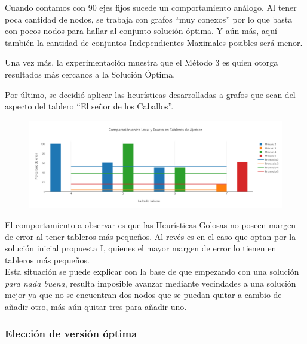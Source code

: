 Cuando contamos con 90 ejes fijos sucede un comportamiento análogo. Al tener poca cantidad de nodos, se trabaja con grafos ``muy conexos'' por lo que basta con pocos nodos para hallar al conjunto solución óptima. Y aún más, aquí también la cantidad de conjuntos Independientes Maximales posibles será menor.   
 
\bigskip

Una vez más, la experimentación muestra que el Método 3 es quien otorga resultados más cercanos a la Solución Óptima.\\

 \bigskip

Por último, se decidió aplicar las heurísticas desarrolladas a grafos que sean del aspecto del tablero ``El señor de los Caballos''. 
 
  \begin{figure}[h!]
   \begin{center}
 	\includegraphics[scale=0.55]{imagenes/local/exacto/tableros.png}
   \end{center}
 \end{figure} 
 
El comportamiento a observar es que las Heurísticas Golosas no poseen margen de error al tener tableros más pequeños. Al revés es en el caso que optan por la solución inicial propuesta I, quienes el mayor margen de error lo tienen en tableros más pequeños.\\

Esta situación se puede explicar con la base de que empezando con una solución \textit{para nada buena}, resulta imposible avanzar mediante vecindades a una solución mejor ya que no se encuentran dos nodos que se puedan quitar a cambio de añadir otro, más aún quitar tres para añadir uno.  
 
\newpage 
 
\subsubsection{Elecci\'on de versi\'on \'optima}

